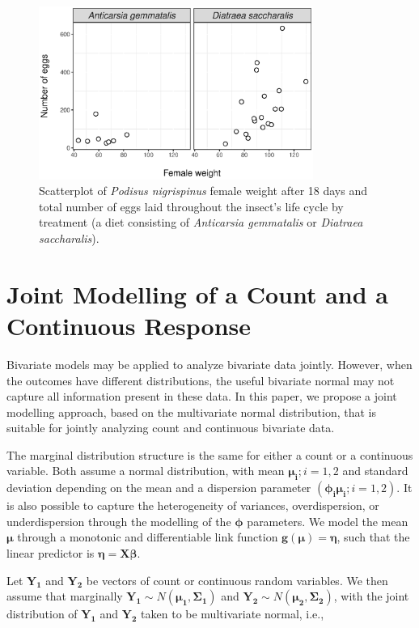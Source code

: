 \documentclass[useAMS,referee]{biom}
\begin{document}
\begin{figure}[h!]
	\centering
	\includegraphics[width=0.8\textwidth]{pod1}
	\caption{Scatterplot of \textit{Podisus nigrispinus} female weight after 18 days and total number of eggs laid throughout the insect's life cycle
		by treatment (a diet consisting of \textit{Anticarsia gemmatalis} or \textit{Diatraea saccharalis}).}
	\label{fig1.1}
\end{figure}


\section{Joint Modelling of a Count and a Continuous Response
}
\label{s:model}

Bivariate models may be applied to analyze bivariate data jointly. However, when the outcomes have different distributions, the useful bivariate normal may not capture all information present in these data. In this paper, we propose a joint modelling approach, based on the multivariate normal distribution, that is suitable for jointly analyzing count and continuous bivariate data. 

The marginal distribution structure is the same for either a count or a continuous variable. Both assume a normal distribution, with mean $\boldsymbol{\mu_i}; i=1,2$ and standard deviation depending on the mean and a dispersion parameter $(\boldsymbol{\phi_i}\boldsymbol{\mu_i}; i=1,2)$. It is also possible to capture the heterogeneity of variances, overdispersion, or underdispersion through the modelling of the $\boldsymbol{\phi}$ parameters. We model the mean $\boldsymbol{\mu}$ through a monotonic and differentiable link function $\boldsymbol{g(\mu) = \eta}$, such that the linear predictor is $\boldsymbol{\eta} = \mathbf{X}\boldsymbol{\beta}$.

Let $\mathbf{Y_1}$ and $\mathbf{Y_2}$ be vectors of count or continuous random variables. We then assume that marginally $\mathbf{Y_1} \sim N(\boldsymbol{\mu_1},\boldsymbol{\Sigma_1})$ and  $\mathbf{Y_2} \sim N(\boldsymbol{\mu_2},\boldsymbol{\Sigma_2})$, with the joint distribution of $\mathbf{Y_1}$ and $\mathbf{Y_2}$ taken to be multivariate normal, i.e.,
\end{document}
